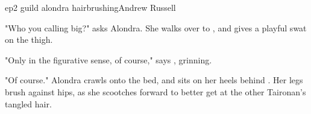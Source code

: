 \documentclass{book}
\begin{document}
\begin{childnode}{ep2 guild alondra hairbrushing}{Andrew Russell}

    "Who you calling big?" asks Alondra. She walks over to \name{}, and gives \himher{} a playful swat on the thigh.

    "Only in the figurative sense, of course," says \name{}, grinning.

    "Of course." Alondra crawls onto the bed, and sits on her heels behind \name{}. Her legs brush against \names{} hips, as she scootches forward to better get at the other Taironan's tangled hair.



\end{childnode}
\end{document}
